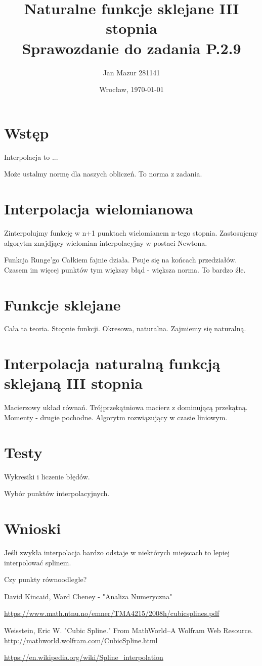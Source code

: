 \documentclass{article}
\author{Jan Mazur 281141}
\date{Wrocław, \today}
\title{\textbf{Naturalne funkcje sklejane III stopnia} \\ Sprawozdanie do zadania P.2.9	}
\begin{document}
\maketitle

\section{Wstęp}
Interpolacja to ...

Może ustalmy normę dla naszych obliczeń. To norma z zadania.

\section{Interpolacja wielomianowa}
Zinterpolujmy funkcję w n+1 punktach wielomianem n-tego stopnia.
Zastosujemy algorytm znajdjący wielomian interpolacyjny w postaci Newtona.

Funkcja Runge'go
Całkiem fajnie działa. Psuje się na końcach przedziałów. Czasem im więcej punktów tym większy błąd - większa norma. To bardzo źle.

\section{Funkcje sklejane}

Cała ta teoria. Stopnie funkcji. Okresowa, naturalna.
Zajmiemy się naturalną.

\section{Interpolacja naturalną funkcją sklejaną III stopnia}
Macierzowy układ równań. Trójprzekątniowa macierz z dominującą przekątną.
Momenty - drugie pochodne.
Algorytm rozwiązujący w czasie liniowym.

\section{Testy}
Wykresiki i liczenie błędów.

Wybór punktów interpolacyjnych.
	
	
\section{Wnioski}
Jeśli zwykła interpolacja bardzo odstaje w niektórych miejscach to lepiej interpolować splinem.

Czy punkty równoodległe?


\begin{thebibliography}{9}
	\itemsep2pt
			
	 David Kincaid, Ward Cheney - "Analiza Numeryczna"
	
	 \url{https://www.math.ntnu.no/emner/TMA4215/2008h/cubicsplines.pdf}
	
	 Weisstein, Eric W. "Cubic Spline." From MathWorld--A Wolfram Web Resource. \url{http://mathworld.wolfram.com/CubicSpline.html}
	
	 \url{https://en.wikipedia.org/wiki/Spline_interpolation}
	 
\end{thebibliography}
\end{document}
